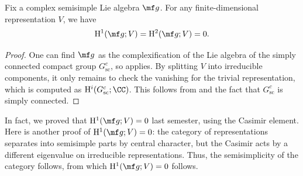 \documentclass[../notes.tex]{subfiles}
\begin{document}
\begin{corollary}[Whitehead] \label{cor:semisimple-has-vanishing-cohomology}
	Fix a complex semisimple Lie algebra $\mf g$. For any finite-dimensional representation $V$, we have
	\[\mathrm H^1(\mf g;V)=\mathrm H^2(\mf g;V)=0.\]
\end{corollary}
\begin{proof}
	One can find $\mf g$ as the complexification of the Lie algebra of the simply connected compact group $G_{\mathrm{sc}}^c$, so  applies. By splitting $V$ into irreducible components, it only remains to check the vanishing for the trivial representation, which is computed as $\mathrm H^i(G_{\mathrm{sc}}^c;\CC)$. This follows from  and the fact that $G_{\mathrm{sc}}^c$ is simply connected.
\end{proof}
\begin{remark}
	In fact, we proved that $\mathrm H^1(\mf g;V)=0$ last semester, using the Casimir element. Here is another proof of $\mathrm H^1(\mf g;V)=0$: the category of representations separates into semisimple parts by central character, but the Casimir acts by a different eigenvalue on irreducible representations. Thus, the semisimplicity of the category follows, from which $\mathrm H^1(\mf g;V)=0$ follows.
\end{remark}
\end{document}
